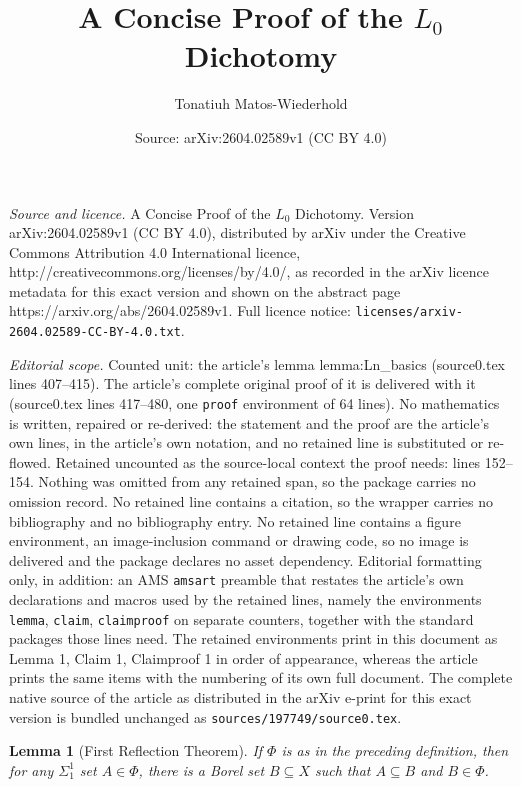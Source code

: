 \documentclass[10pt,a4paper]{amsart}
\title{A Concise Proof of the $L_0$ Dichotomy}
\author{Tonatiuh Matos-Wiederhold}
\date{Source: arXiv:2604.02589v1 (CC BY 4.0)}
\newtheorem{lemma}{Lemma}
\begin{document}
\maketitle

\noindent\emph{Source and licence.} A Concise Proof of the $L_0$ Dichotomy. Version arXiv:2604.02589v1 (CC BY 4.0), distributed by arXiv under the Creative Commons Attribution 4.0 International licence, http://creativecommons.org/licenses/by/4.0/, as recorded in the arXiv licence metadata for this exact version and shown on the abstract page https://arxiv.org/abs/2604.02589v1. Full licence notice: \texttt{licenses/arxiv-2604.02589-CC-BY-4.0.txt}.\par\smallskip

\noindent\textit{Editorial scope.} Counted unit: the article's lemma lemma:Ln\_basics (source0.tex lines 407--415). The article's complete original proof of it is delivered with it (source0.tex lines 417--480, one \texttt{proof} environment of 64 lines). No mathematics is written, repaired or re-derived: the statement and the proof are the article's own lines, in the article's own notation, and no retained line is substituted or re-flowed.  Retained uncounted as the source-local context the proof needs: lines 152--154.  Nothing was omitted from any retained span, so the package carries no omission record.  No retained line contains a citation, so the wrapper carries no bibliography and no bibliography entry.  No retained line contains a figure environment, an image-inclusion command or drawing code, so no image is delivered and the package declares no asset dependency.  Editorial formatting only, in addition: an AMS \texttt{amsart} preamble that restates the article's own declarations and macros used by the retained lines, namely the environments \texttt{lemma}, \texttt{claim}, \texttt{claimproof} on separate counters, together with the standard packages those lines need.  The retained environments print in this document as Lemma 1, Claim 1, Claimproof 1 in order of appearance, whereas the article prints the same items with the numbering of its own full document.  The complete native source of the article as distributed in the arXiv e-print for this exact version is bundled unchanged as \texttt{sources/197749/source0.tex}.
\begin{lemma}[First Reflection Theorem]\label{lemma:first-reflection}
    If $\Phi$ is as in the preceding definition, then for any $\Sigma^1_1$ set $A\in\Phi$, there is a Borel set $B\subseteq X$ such that $A\subseteq B$ and $B\in\Phi$.
\end{lemma}
\end{document}
